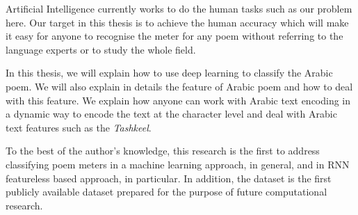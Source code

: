 Artificial Intelligence currently works to do the human tasks such as our problem here. Our target in this thesis is to achieve the human accuracy which will make it easy for anyone to recognise the meter for any poem without referring to the language experts or to study the whole field.

In this thesis, we will explain how to use deep learning to classify the Arabic poem. We will also explain in details the feature of Arabic poem and how to deal with this feature. We explain how anyone can work with Arabic text encoding in a dynamic way to encode the text at the character level and deal with Arabic text features such as the \textit{Tashkeel}.

To the best of the author’s knowledge, this research is the first to address classifying poem meters in a machine learning approach, in general, and in RNN featureless based approach, in particular. In addition, the dataset is the first publicly available dataset prepared for the purpose of future computational research.




